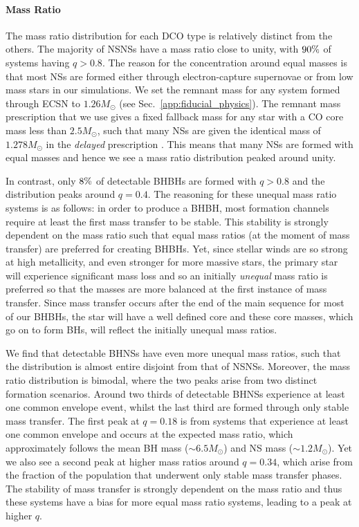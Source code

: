 \paragraph{Mass Ratio} The mass ratio distribution for each DCO type is relatively distinct from the others. The majority of NSNSs have a mass ratio close to unity, with $90\%{}$ of systems having $q > 0.8$. The reason for the concentration around equal masses is that most NSs are formed either through electron-capture supernovae or from low mass stars in our simulations. We set the remnant mass for any system formed through ECSN to $1.26 \unit{M_{\odot}}$ (see Sec.~\ref{app:fiducial_physics}). The remnant mass prescription that we use gives a fixed fallback mass for any star with a CO core mass less than $2.5 \unit{M_\odot}$, such that many NSs are given the identical mass of $1.278 \unit{M_\odot}$ in the \textit{delayed} prescription \citep[see][Eq.~19]{Fryer+2012}. This means that many NSs are formed with equal masses and hence we see a mass ratio distribution peaked around unity.

In contrast, only $8\%{}$ of detectable BHBHs are formed with $q > 0.8$ and the distribution peaks around $q = 0.4$. The reasoning for these unequal mass ratio systems is as follows: in order to produce a BHBH, most formation channels require at least the first mass transfer to be stable. This stability is strongly dependent on the mass ratio such that equal mass ratios (at the moment of mass transfer) are preferred for creating BHBHs. Yet, since stellar winds are so strong at high metallicity, and even stronger for more massive stars, the primary star will experience significant mass loss and so an initially \textit{unequal} mass ratio is preferred so that the masses are more balanced at the first instance of mass transfer. Since mass transfer occurs after the end of the main sequence for most of our BHBHs, the star will have a well defined core and these core masses, which go on to form BHs, will reflect the initially unequal mass ratios.

We find that detectable BHNSs have even more unequal mass ratios, such that the distribution is almost entire disjoint from that of NSNSs. Moreover, the mass ratio distribution is bimodal, where the two peaks arise from two distinct formation scenarios. Around two thirds of detectable BHNSs experience at least one common envelope event, whilst the last third are formed through only stable mass transfer. The first peak at $q = 0.18$ is from systems that experience at least one common envelope and occurs at the expected mass ratio, which approximately follows the mean BH mass ($\sim 6.5 \unit{M_\odot}$) and NS mass ($\sim 1.2 \unit{M_\odot}$). Yet we also see a second peak at higher mass ratios around $q = 0.34$, which arise from the fraction of the population that underwent only stable mass transfer phases. The stability of mass transfer is strongly dependent on the mass ratio and thus these systems have a bias for more equal mass ratio systems, leading to a peak at higher $q$.

